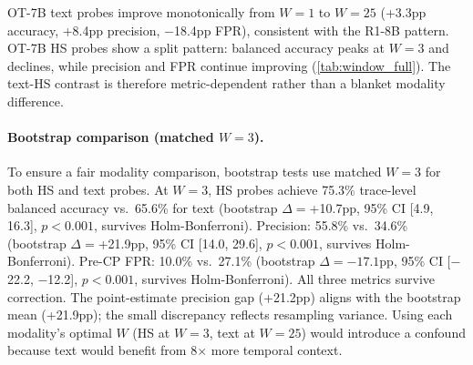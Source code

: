 \begin{table}[htbp]
\centering
\small
\caption{OT-7B text probe window ablation (step-level). Text probes improve monotonically with larger $W$, contrasting with the HS probes on this model which peak at $W{=}3$.}
\label{tab:ot7b_text_window}
\end{table}

OT-7B text probes improve monotonically from $W{=}1$ to $W{=}25$ (+3.3pp accuracy, +8.4pp precision, $-$18.4pp FPR), consistent with the R1-8B pattern. OT-7B HS probes show a split pattern: balanced accuracy peaks at $W{=}3$ and declines, while precision and FPR continue improving (\cref{tab:window_full}). The text-HS contrast is therefore metric-dependent rather than a blanket modality difference.

\paragraph{Bootstrap comparison (matched $W{=}3$).} To ensure a fair modality comparison, bootstrap tests use matched $W{=}3$ for both HS and text probes. At $W{=}3$, HS probes achieve 75.3\% trace-level balanced accuracy vs.\ 65.6\% for text (bootstrap $\Delta{=}$+10.7pp, 95\% CI [4.9, 16.3], $p{<}0.001$, survives Holm-Bonferroni). Precision: 55.8\% vs.\ 34.6\% (bootstrap $\Delta{=}$+21.9pp, 95\% CI [14.0, 29.6], $p{<}0.001$, survives Holm-Bonferroni). Pre-CP FPR: 10.0\% vs.\ 27.1\% (bootstrap $\Delta{=}{-}17.1$pp, 95\% CI [$-$22.2, $-$12.2], $p{<}0.001$, survives Holm-Bonferroni). All three metrics survive correction. The point-estimate precision gap (+21.2pp) aligns with the bootstrap mean (+21.9pp); the small discrepancy reflects resampling variance. Using each modality's optimal $W$ (HS at $W{=}3$, text at $W{=}25$) would introduce a confound because text would benefit from 8$\times$ more temporal context.


